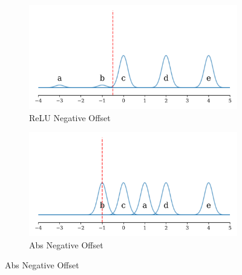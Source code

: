 \begin{figure}[ht]
    \centering

    \begin{subfigure}[b]{0.49\textwidth}
        \centering
        \includegraphics[width=\textwidth]{images/offset_relu_neg}
        \caption{ReLU Negative Offset}
        \label{fig:relu_offset_down}
    \end{subfigure}
    \hfill
    \begin{subfigure}[b]{0.49\textwidth}
        \centering
        \includegraphics[width=\textwidth]{images/offset_abs_neg}
        \caption{Abs Negative Offset}
        \label{fig:abs_offset_down}
    \end{subfigure}


\end{figure}
